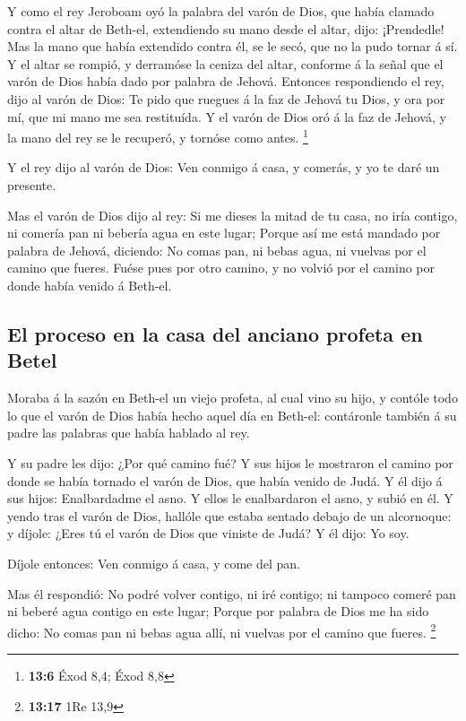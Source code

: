  Y como el rey Jeroboam oyó la palabra del varón de Dios,
que había clamado contra el altar de Beth-el, extendiendo su mano desde
el altar, dijo: ¡Prendedle! Mas la mano que había extendido contra él,
se le secó, que no la pudo tornar á sí.  Y el altar se
rompió, y derramóse la ceniza del altar, conforme á la señal que el
varón de Dios había dado por palabra de Jehová.  Entonces
respondiendo el rey, dijo al varón de Dios: Te pido que ruegues á la faz
de Jehová tu Dios, y ora por mí, que mi mano me sea restituída. Y el
varón de Dios oró á la faz de Jehová, y la mano del rey se le recuperó,
y tornóse como antes. \footnote{\textbf{13:6} Éxod 8,4; Éxod 8,8}

 Y el rey dijo al varón de Dios: Ven conmigo á casa, y
comerás, y yo te daré un presente.

 Mas el varón de Dios dijo al rey: Si me dieses la mitad de
tu casa, no iría contigo, ni comería pan ni bebería agua en este lugar;
 Porque así me está mandado por palabra de Jehová, diciendo:
No comas pan, ni bebas agua, ni vuelvas por el camino que fueres.
 Fuése pues por otro camino, y no volvió por el camino por
donde había venido á Beth-el.

\hypertarget{el-proceso-en-la-casa-del-anciano-profeta-en-betel}{%
\subsection{El proceso en la casa del anciano profeta en
Betel}\label{el-proceso-en-la-casa-del-anciano-profeta-en-betel}}

 Moraba á la sazón en Beth-el un viejo profeta, al cual
vino su hijo, y contóle todo lo que el varón de Dios había hecho aquel
día en Beth-el: contáronle también á su padre las palabras que había
hablado al rey.

 Y su padre les dijo: ¿Por qué camino fué? Y sus hijos le
mostraron el camino por donde se había tornado el varón de Dios, que
había venido de Judá.  Y él dijo á sus hijos: Enalbardadme
el asno. Y ellos le enalbardaron el asno, y subió en él.  Y
yendo tras el varón de Dios, hallóle que estaba sentado debajo de un
alcornoque: y díjole: ¿Eres tú el varón de Dios que viniste de Judá? Y
él dijo: Yo soy.

 Díjole entonces: Ven conmigo á casa, y come del pan.

 Mas él respondió: No podré volver contigo, ni iré contigo;
ni tampoco comeré pan ni beberé agua contigo en este lugar;
 Porque por palabra de Dios me ha sido dicho: No comas pan
ni bebas agua allí, ni vuelvas por el camino que fueres. \footnote{\textbf{13:17}
  1Re 13,9}

